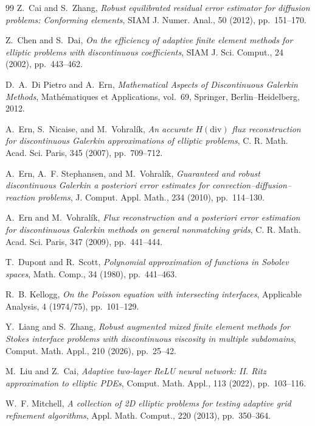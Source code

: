 \documentclass[10pt,pdftex]{amsart}%
\numberwithin{equation}{section}
\begin{document}
\begin{thebibliography}{99}
Z.~Cai and S.~Zhang,
\newblock \emph{Robust equilibrated residual error estimator for diffusion problems: Conforming elements},
\newblock SIAM J. Numer. Anal., 50 (2012), pp.~151--170.

Z.~Chen and S.~Dai,
\newblock \emph{On the efficiency of adaptive finite element methods for elliptic problems with discontinuous coefficients},
\newblock SIAM J. Sci. Comput., 24 (2002), pp.~443--462.

D.~A.~Di Pietro and A.~Ern,
\newblock \emph{Mathematical Aspects of Discontinuous Galerkin Methods},
\newblock Math\'ematiques et Applications, vol.~69, Springer, Berlin--Heidelberg, 2012.

A.~Ern, S.~Nicaise, and M.~Vohral\'ik,
\newblock \emph{An accurate $H(\mathrm{div})$ flux reconstruction for discontinuous Galerkin approximations of elliptic problems},
\newblock C. R. Math. Acad. Sci. Paris, 345 (2007), pp.~709--712.

A.~Ern, A.~F. Stephansen, and M.~Vohral\'ik,
\newblock \emph{Guaranteed and robust discontinuous Galerkin a posteriori error estimates for convection--diffusion--reaction problems},
\newblock J. Comput. Appl. Math., 234 (2010), pp.~114--130.

A.~Ern and M.~Vohral\'ik,
\newblock \emph{Flux reconstruction and a posteriori error estimation for discontinuous Galerkin methods on general nonmatching grids},
\newblock C. R. Math. Acad. Sci. Paris, 347 (2009), pp.~441--444.

T.~Dupont and R.~Scott,
\newblock \emph{Polynomial approximation of functions in Sobolev spaces},
\newblock Math. Comp., 34 (1980), pp.~441--463.

R.~B. Kellogg,
\newblock \emph{On the Poisson equation with intersecting interfaces},
\newblock Applicable Analysis, 4 (1974/75), pp.~101--129.

Y.~Liang and S.~Zhang,
\newblock \emph{Robust augmented mixed finite element methods for Stokes interface problems with discontinuous viscosity in multiple subdomains},
\newblock Comput. Math. Appl., 210 (2026), pp.~25--42.

M.~Liu and Z.~Cai,
\newblock \emph{Adaptive two-layer ReLU neural network: II. Ritz approximation to elliptic PDEs},
\newblock Comput. Math. Appl., 113 (2022), pp.~103--116.

W.~F. Mitchell,
\newblock \emph{A collection of 2D elliptic problems for testing adaptive grid refinement algorithms},
\newblock Appl. Math. Comput., 220 (2013), pp.~350--364.


\end{thebibliography}
\end{document}

